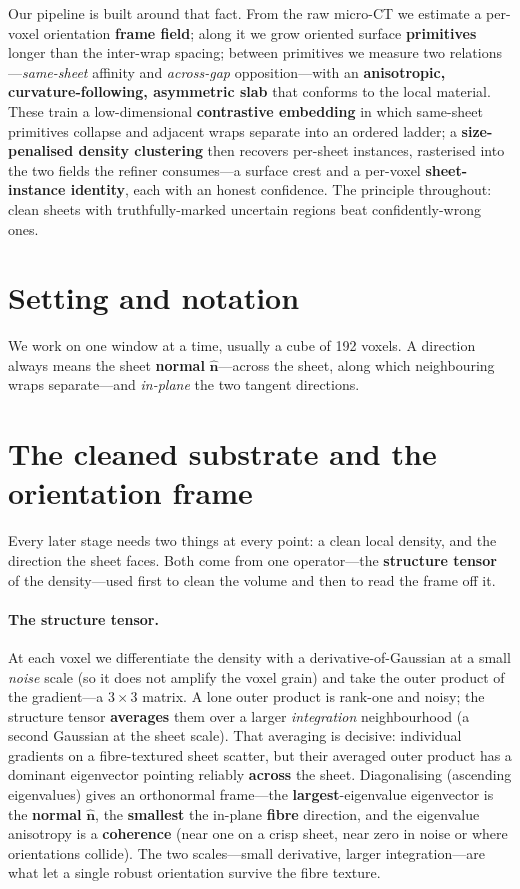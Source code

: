 \documentclass[10pt,twocolumn,a4paper]{article}
\newcommand{\nhat}{\ensuremath{\hat{\mathbf{n}}}}
\begin{document}
Our pipeline is built around that fact. From the raw micro-CT we estimate a
per-voxel orientation \textbf{frame field}; along it we grow oriented surface
\textbf{primitives} longer than the inter-wrap spacing; between primitives we
measure two relations---\emph{same-sheet} affinity and \emph{across-gap}
opposition---with an \textbf{anisotropic, curvature-following, asymmetric slab}
that conforms to the local material. These train a low-dimensional
\textbf{contrastive embedding} in which same-sheet primitives collapse and
adjacent wraps separate into an ordered ladder; a \textbf{size-penalised density
clustering} then recovers per-sheet instances, rasterised into the two fields
the refiner consumes---a surface crest and a per-voxel \textbf{sheet-instance
identity}, each with an honest confidence. The principle throughout: clean
sheets with truthfully-marked uncertain regions beat confidently-wrong ones.

\section{Setting and notation}
We work on one window at a time, usually a cube of 192 voxels. A direction always
means the sheet \textbf{normal} \nhat---across the sheet, along which neighbouring
wraps separate---and \emph{in-plane} the two tangent directions.

\section{The cleaned substrate and the orientation frame}
Every later stage needs two things at every point: a clean local density, and
the direction the sheet faces. Both come from one operator---the
\textbf{structure tensor} of the density---used first to clean the volume and
then to read the frame off it.

\paragraph{The structure tensor.} At each voxel we differentiate the density
with a derivative-of-Gaussian at a small \emph{noise} scale (so it does not
amplify the voxel grain) and take the outer product of the gradient---a
$3\times3$ matrix. A lone outer product is rank-one and noisy; the structure
tensor \textbf{averages} them over a larger \emph{integration} neighbourhood (a
second Gaussian at the sheet scale). That averaging is decisive: individual
gradients on a fibre-textured sheet scatter, but their averaged outer product
has a dominant eigenvector pointing reliably \textbf{across} the sheet.
Diagonalising (ascending eigenvalues) gives an orthonormal frame---the
\textbf{largest}-eigenvalue eigenvector is the \textbf{normal} \nhat, the
\textbf{smallest} the in-plane \textbf{fibre} direction, and the eigenvalue
anisotropy is a \textbf{coherence} (near one on a crisp sheet, near zero in noise
or where orientations collide). The two scales---small derivative, larger
integration---are what let a single robust orientation survive the fibre texture.
\end{document}
